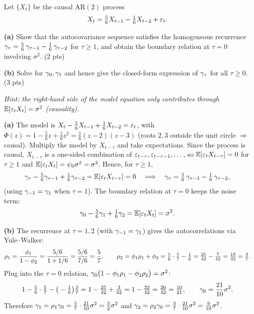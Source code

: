 \documentclass[11pt]{article}
\begin{document}
\statementstart
Let $\{X_t\}$ be the causal $\mathrm{AR}(2)$ process
\[
X_t=\tfrac56 X_{t-1}-\tfrac16 X_{t-2}+\varepsilon_t .
\]

\textbf{(a)} Show that the autocovariance sequence satisfies the homogeneous recurrence
$\gamma_\tau=\tfrac56\,\gamma_{\tau-1}-\tfrac16\,\gamma_{\tau-2}$ for $\tau\ge1$, and obtain the boundary relation at $\tau=0$ involving $\sigma^2$. \hfill(2 pts)

\textbf{(b)} Solve for $\gamma_0,\gamma_1$ and hence give the closed-form expression of $\gamma_\tau$ for all $\tau\ge0$. \hfill(3 pts)

\emph{Hint: the right-hand side of the model equation only contributes through $\mathbb{E}[\varepsilon_t X_t]=\sigma^2$ (causality).}
\statementend

\textbf{(a)} The model is $X_t-\tfrac56 X_{t-1}+\tfrac16 X_{t-2}=\varepsilon_t$, with $\Phi(z)=1-\tfrac56 z+\tfrac16 z^2=\tfrac16(z-2)(z-3)$ (roots $2,3$ outside the unit circle $\Rightarrow$ causal). Multiply the model by $X_{t-\tau}$ and take expectations. Since the process is causal, $X_{t-\tau}$ is a one-sided combination of $\varepsilon_{t-\tau},\varepsilon_{t-\tau-1},\dots$, so $\mathbb{E}[\varepsilon_t X_{t-\tau}]=0$ for $\tau\ge1$ and $\mathbb{E}[\varepsilon_t X_t]=\psi_0\sigma^2=\sigma^2$. Hence, for $\tau\ge1$,
\[
\gamma_\tau-\tfrac56\gamma_{\tau-1}+\tfrac16\gamma_{\tau-2}=\mathbb{E}[\varepsilon_t X_{t-\tau}]=0
\quad\Longrightarrow\quad
\gamma_\tau=\tfrac56\,\gamma_{\tau-1}-\tfrac16\,\gamma_{\tau-2},
\]
(using $\gamma_{-1}=\gamma_1$ when $\tau=1$). The boundary relation at $\tau=0$ keeps the noise term:
\[
\gamma_0-\tfrac56\gamma_{1}+\tfrac16\gamma_{2}=\mathbb{E}[\varepsilon_t X_t]=\sigma^2 .
\]

\textbf{(b)} The recurrence at $\tau=1,2$ (with $\gamma_{-1}=\gamma_1$) gives the autocorrelations via Yule--Walker:
\[
\rho_1=\frac{\phi_1}{1-\phi_2}=\frac{5/6}{1+1/6}=\frac{5/6}{7/6}=\frac57,
\qquad
\rho_2=\phi_1\rho_1+\phi_2=\tfrac56\cdot\tfrac57-\tfrac16=\tfrac{25}{42}-\tfrac{7}{42}=\tfrac{18}{42}=\tfrac37 .
\]
Plug into the $\tau=0$ relation, $\gamma_0\big(1-\phi_1\rho_1-\phi_2\rho_2\big)=\sigma^2$:
\[
1-\tfrac56\cdot\tfrac57-\big(-\tfrac16\big)\tfrac37=1-\tfrac{25}{42}+\tfrac{3}{42}=1-\tfrac{22}{42}=\tfrac{20}{42}=\tfrac{10}{21},
\qquad
\gamma_0=\frac{21}{10}\sigma^2 .
\]
Therefore $\gamma_1=\rho_1\gamma_0=\tfrac57\cdot\tfrac{21}{10}\sigma^2=\tfrac32\sigma^2$ and $\gamma_2=\rho_2\gamma_0=\tfrac37\cdot\tfrac{21}{10}\sigma^2=\tfrac9{10}\sigma^2$.
\end{document}
